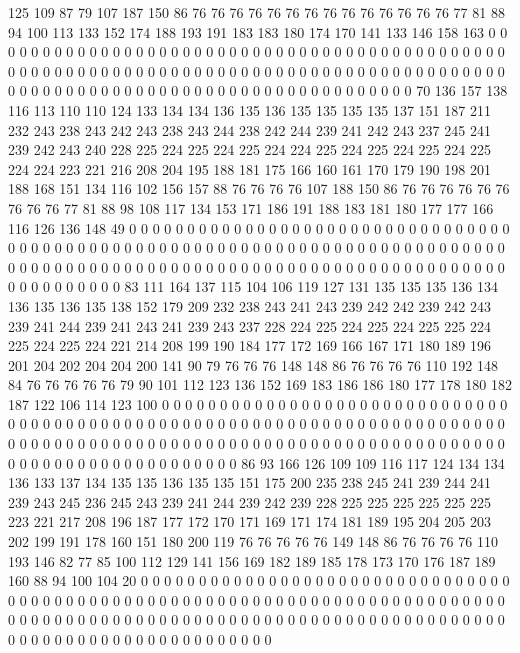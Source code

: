 125 109 87 79 107 187 150 86 76 76 76 76 76 76 76 76 76 76 76 76
76 76 77 81 88 94 100 113 133 152 174 188 193 191 183 183 180 174 170 141
133 146 158 163 0 0 0 0 0 0 0 0 0 0 0 0 0 0 0 0
0 0 0 0 0 0 0 0 0 0 0 0 0 0 0 0 0 0 0 0
0 0 0 0 0 0 0 0 0 0 0 0 0 0 0 0 0 0 0 0
0 0 0 0 0 0 0 0 0 0 0 0 0 0 0 0 0 0 0 0
0 0 0 0 0 0 0 0 0 0 0 0 0 0 0 0 0 0 0 0
0 0 0 0 0 0 0 0 0 0 0 0 0 0 0 0 0 0 0 0
0 0 0 0 0 0 0 70 136 157 138 116 113 110 110 124 133 134 134 136
135 136 135 135 135 135 137 151 187 211 232 243 238 243 242 243 238 243 244 238
242 244 239 241 242 243 237 245 241 239 242 243 240 228 225 224 225 224 225 224
224 225 224 225 224 225 224 225 224 224 223 221 216 208 204 195 188 181 175 166
160 161 170 179 190 198 201 188 168 151 134 116 102 156 157 88 76 76 76 76
107 188 150 86 76 76 76 76 76 76 76 76 76 77 81 88 98 108 117 134
153 171 186 191 188 183 181 180 177 177 166 116 126 136 148 49 0 0 0 0
0 0 0 0 0 0 0 0 0 0 0 0 0 0 0 0 0 0 0 0
0 0 0 0 0 0 0 0 0 0 0 0 0 0 0 0 0 0 0 0
0 0 0 0 0 0 0 0 0 0 0 0 0 0 0 0 0 0 0 0
0 0 0 0 0 0 0 0 0 0 0 0 0 0 0 0 0 0 0 0
0 0 0 0 0 0 0 0 0 0 0 0 0 0 0 0 0 0 0 0
0 0 0 0 0 0 0 0 0 0 0 0 0 0 0 0 0 0 0 0
0 0 0 0 0 83 111 164 137 115 104 106 119 127 131 135 135 135 136 134
136 135 136 135 138 152 179 209 232 238 243 241 243 239 242 242 239 242 243 239
241 244 239 241 243 241 239 243 237 228 224 225 224 225 224 225 225 224 225 224
225 224 221 214 208 199 190 184 177 172 169 166 167 171 180 189 196 201 204 202
204 204 200 141 90 79 76 76 76 148 148 86 76 76 76 76 110 192 148 84
76 76 76 76 76 79 90 101 112 123 136 152 169 183 186 186 180 177 178 180
182 187 122 106 114 123 100 0 0 0 0 0 0 0 0 0 0 0 0 0
0 0 0 0 0 0 0 0 0 0 0 0 0 0 0 0 0 0 0 0
0 0 0 0 0 0 0 0 0 0 0 0 0 0 0 0 0 0 0 0
0 0 0 0 0 0 0 0 0 0 0 0 0 0 0 0 0 0 0 0
0 0 0 0 0 0 0 0 0 0 0 0 0 0 0 0 0 0 0 0
0 0 0 0 0 0 0 0 0 0 0 0 0 0 0 0 0 0 0 0
0 0 0 0 0 0 0 0 0 0 0 0 0 0 0 0 0 0 0 0
0 0 0 86 93 166 126 109 109 116 117 124 134 134 136 133 137 134 135 135
136 135 135 151 175 200 235 238 245 241 239 244 241 239 243 245 236 245 243 239
241 244 239 242 239 228 225 225 225 225 225 225 223 221 217 208 196 187 177 172
170 171 169 171 174 181 189 195 204 205 203 202 199 191 178 160 151 180 200 119
76 76 76 76 76 149 148 86 76 76 76 76 110 193 146 82 77 85 100 112
129 141 156 169 182 189 185 178 173 170 176 187 189 160 88 94 100 104 20 0
0 0 0 0 0 0 0 0 0 0 0 0 0 0 0 0 0 0 0 0
0 0 0 0 0 0 0 0 0 0 0 0 0 0 0 0 0 0 0 0
0 0 0 0 0 0 0 0 0 0 0 0 0 0 0 0 0 0 0 0
0 0 0 0 0 0 0 0 0 0 0 0 0 0 0 0 0 0 0 0
0 0 0 0 0 0 0 0 0 0 0 0 0 0 0 0 0 0 0 0
0 0 0 0 0 0 0 0 0 0 0 0 0 0 0 0 0 0 0 0
0 0 0 0 0 0 0 0 0 0 0 0 0 0 0 0 0 0 0 0
